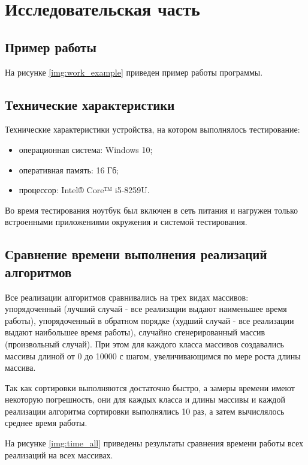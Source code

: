 \chapter{Исследовательская часть}

\section{Пример работы}

На рисунке \ref{img:work_example} приведен пример работы программы.


\section{Технические характеристики}

Технические характеристики устройства, на котором выполнялось тестирование:

\begin{itemize}
	\item операционная система: Windows 10;
	\item оперативная память: 16 Гб;
	\item процессор: Intel® Core™ i5-8259U.
\end{itemize}

Во время тестирования ноутбук был включен в сеть питания и нагружен только встроенными приложениями окружения и системой тестирования.


\section{Сравнение времени выполнения реализаций алгоритмов}

 Все реализации алгоритмов сравнивались на трех видах массивов: упорядоченный (лучший случай - все реализации выдают наименьшее время работы), упорядоченный в обратном порядке (худший случай - все реализации выдают наибольшее время работы), случайно сгенерированный массив (произвольный случай). При этом для каждого класса массивов создавались массивы длиной от 0 до 10000 с шагом, увеличивающимся по мере роста длины массива. 
 
 Так как сортировки выполняются достаточно быстро, а замеры времени имеют некоторую погрешность, они для каждых класса и длины массивы и каждой реализации алгоритма сортировки выполнялись 10 раз, а затем вычислялось среднее время работы.
 
 
На рисунке \ref{img:time_all} приведены результаты сравнения времени работы всех реализаций на всех массивах. 

